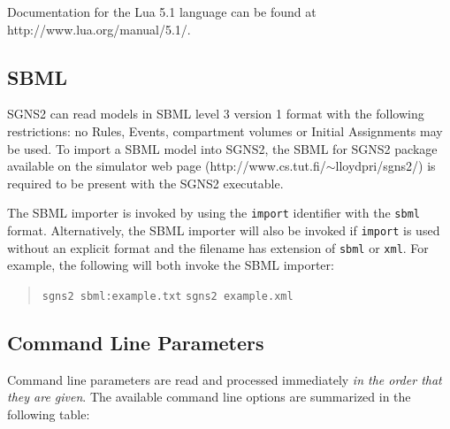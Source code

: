 \documentclass[10pt]{article}
\newcommand{\code}[1]{{\tt {#1}}}
\newcommand{\progexe}{sgns2}
\begin{document}
Documentation for the Lua 5.1 language can be found at\\http://www.lua.org/manual/5.1/.

\subsection{SBML}
\label{sec:sbml}

SGNS2 can read models in SBML level 3 version 1 format with the following restrictions: no Rules, Events, compartment volumes or Initial Assignments may be used. To import a SBML model into SGNS2, the SBML for SGNS2 package available on the simulator web page (http://www.cs.tut.fi/$\sim$lloydpri/sgns2/) is required to be present with the SGNS2 executable.

The SBML importer is invoked by using the \code{import} identifier with the \code{sbml} format. Alternatively, the SBML importer will also be invoked if \code{import} is used without an explicit format and the filename has extension of \code{sbml} or \code{xml}. For example, the following will both invoke the SBML importer:

\begin{quote}
\code{\progexe\ sbml:example.txt}
\code{\progexe\ example.xml}
\end{quote}

\subsection{Command Line Parameters}
\label{sec:cmdline}

Command line parameters are read and processed immediately \emph{in the order that they are given}. The available command line options are summarized in the following table:
\end{document}

